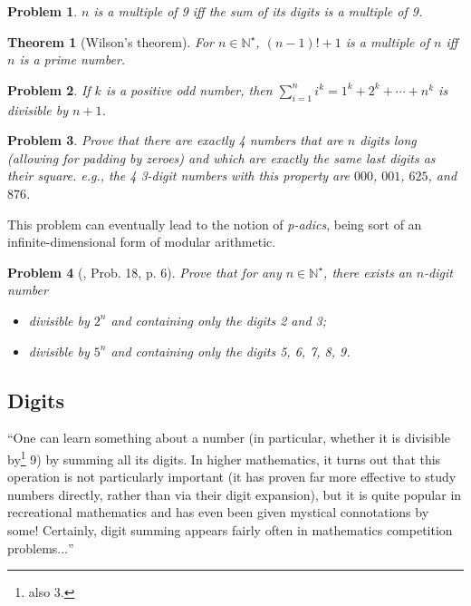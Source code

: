 \documentclass[oneside]{book}
\numberwithin{equation}{section}
\newtheorem{theorem}{Theorem}[section]
\newtheorem{problem}{Problem}[section]
\begin{document}
\begin{problem}
	$n$ is a multiple of 9 iff the sum of its digits is a multiple of 9.
\end{problem}

\begin{theorem}[Wilson's theorem]
	For $n\in\mathbb{N}^\star$, $(n - 1)! + 1$ is a multiple of $n$ iff $n$ is a prime number.
\end{theorem}

\begin{problem}
	If $k$ is a positive odd number, then $\sum_{i=1}^n i^k = 1^k + 2^k + \cdots + n^k$ is divisible by $n + 1$.
\end{problem}

\begin{problem}
	Prove that there are exactly 4 numbers that are $n$ digits long (allowing for padding by zeroes) and which are exactly the same last digits as their square. e.g., the 4 3-digit numbers with this property are $000$, $001$, $625$, and $876$.
\end{problem}
This problem can eventually lead to the notion of \textit{p-adics}, being sort of an infinite-dimensional form of modular arithmetic.

\begin{problem}[\cite{Gelca_Andreescu2017}, Prob. 18, p. 6]
	Prove that for any $n\in\mathbb{N}^\star$, there exists an $n$-digit number
	\begin{itemize}
		\item[(a)] divisible by $2^n$ and containing only the digits 2 and 3;
		\item[(b)] divisible by $5^n$ and containing only the digits 5, 6, 7, 8, 9.
	\end{itemize}
\end{problem}

\subsection{Digits}
``One can learn something about a number (in particular, whether it is divisible by\footnote{also 3.} 9) by summing all its digits. In higher mathematics, it turns out that this operation is not particularly important (it has proven far more effective to study numbers directly, rather than
via their digit expansion), but it is quite popular in recreational mathematics and has even been given mystical connotations by some! Certainly, digit summing appears fairly often in mathematics competition problems$\ldots$''
\end{document}
